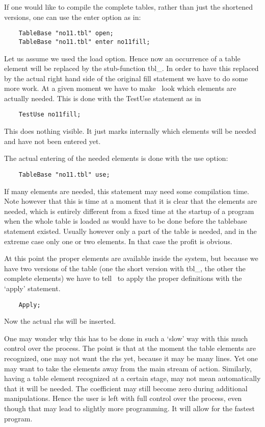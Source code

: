 If one would like to compile the complete tables, rather 
than just the shortened versions, one can use the enter option as in:
\begin{verbatim}
    TableBase "no11.tbl" open;
    TableBase "no11.tbl" enter no11fill;
\end{verbatim}

Let us assume we used the load option. Hence now an occurrence of a table 
element will be replaced by the stub-function 
tbl\_. In order to have this replaced by the actual right hand 
side of the original fill statement we have to do some more work. At a 
given moment we have to make \FORM\ look which elements are actually needed. 
This is done with the TestUse statement as in
\begin{verbatim}
    TestUse no11fill;
\end{verbatim}
This does nothing visible. It just marks internally which elements will be 
needed and have not been entered yet.

The actual entering of the needed elements is done with the use 
option:\begin{verbatim}
    TableBase "no11.tbl" use;
\end{verbatim}
If many elements are needed, this statement may need some compilation time. 
Note however that this is time at a moment that it is clear that the 
elements are needed, which is entirely different from a fixed time at the 
startup of a program when the whole table is loaded as would have to be 
done before the tablebase statement existed. Usually however only a 
part of the table is needed, and in the extreme case only one or two 
elements. In that case the profit is obvious.

At this point the proper elements are available inside the system, but 
because we have two versions of the table (one the short version with 
tbl\_, the other the complete elements) we have to tell \FORM\ to apply 
the proper definitions with the `apply' statement.
\begin{verbatim}
    Apply;
\end{verbatim}
Now the actual rhs will be inserted.

One may wonder why this has to be done in such a `slow' way with this much 
control over the process. The point is that at the moment the table 
elements are recognized, one may not want the rhs yet, because it may be 
many lines. Yet one may want to take the elements away from the main stream 
of action. Similarly, having a table element recognized at a certain stage, 
may not mean automatically that it will be needed. The coefficient may 
still become zero during additional manipulations. Hence the user is left 
with full control over the process, even though that may lead to slightly 
more programming. It will allow for the fastest program.

